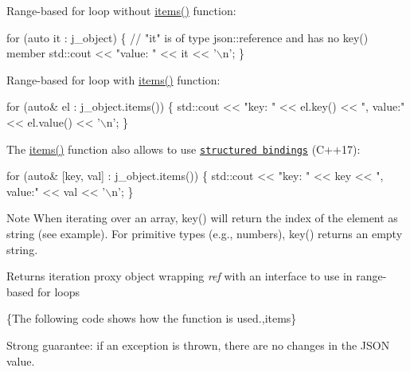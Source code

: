 Range-\/based for loop without {\ttfamily \hyperlink{classnlohmann_1_1basic__json_afe3e137ace692efa08590d8df40f58dd}{items()}} function\+:


\begin{DoxyCode}
\textcolor{keywordflow}{for} (\textcolor{keyword}{auto} it : j\_object)
\{
    \textcolor{comment}{// "it" is of type json::reference and has no key() member}
    std::cout << \textcolor{stringliteral}{"value: "} << it << \textcolor{charliteral}{'\(\backslash\)n'};
\}
\end{DoxyCode}


Range-\/based for loop with {\ttfamily \hyperlink{classnlohmann_1_1basic__json_afe3e137ace692efa08590d8df40f58dd}{items()}} function\+:


\begin{DoxyCode}
\textcolor{keywordflow}{for} (\textcolor{keyword}{auto}& el : j\_object.items())
\{
    std::cout << \textcolor{stringliteral}{"key: "} << el.key() << \textcolor{stringliteral}{", value:"} << el.value() << \textcolor{charliteral}{'\(\backslash\)n'};
\}
\end{DoxyCode}


The {\ttfamily \hyperlink{classnlohmann_1_1basic__json_afe3e137ace692efa08590d8df40f58dd}{items()}} function also allows to use \href{https://en.cppreference.com/w/cpp/language/structured_binding}{\tt structured bindings} (C++17)\+:


\begin{DoxyCode}
\textcolor{keywordflow}{for} (\textcolor{keyword}{auto}& [key, val] : j\_object.items())
\{
    std::cout << \textcolor{stringliteral}{"key: "} << key << \textcolor{stringliteral}{", value:"} << val << \textcolor{charliteral}{'\(\backslash\)n'};
\}
\end{DoxyCode}


\begin{DoxyNote}{Note}
When iterating over an array, {\ttfamily key()} will return the index of the element as string (see example). For primitive types (e.\+g., numbers), {\ttfamily key()} returns an empty string.
\end{DoxyNote}
\begin{DoxyReturn}{Returns}
iteration proxy object wrapping {\itshape ref} with an interface to use in range-\/based for loops
\end{DoxyReturn}
\{The following code shows how the function is used.,items\}

Strong guarantee\+: if an exception is thrown, there are no changes in the J\+S\+ON value.


